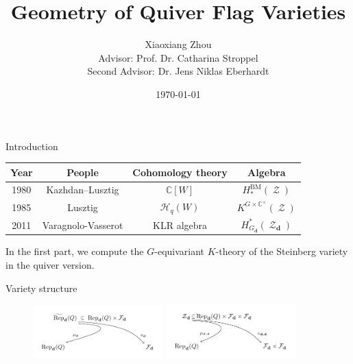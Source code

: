 \documentclass{beamer}
\numberwithin{equation}{section}
\theoremstyle{plain}
\numberwithin{equation}{section}
\theoremstyle{remark}
\DeclareMathOperator{\St}{\mathcal{Z}}
\DeclareMathOperator{\BM}{\operatorname{BM}}
\newcommand{\dimvec}[1]{\mathbf{#1}}
\def\arraystretch{1}
\begin{document}


\title{Geometry of Quiver Flag Varieties}
\author[Xiaoxiang Zhou]{Xiaoxiang Zhou\\[10mm]{\small Advisor: Prof. Dr. Catharina Stroppel \\ Second Advisor: Dr. Jens Niklas Eberhardt}}
\date{\today}

\begin{frame}
	\titlepage
\end{frame}

\begin{frame}[fragile]{Introduction}
\begingroup
\def\arraystretch{1.2}
\begin{table}[]
\begin{tabular}{c|c|c|c}
\hline
Year & People             & Cohomology theory  & Algebra                                    \\ \hline
1980 & Kazhdan--Lusztig   & $\mathbb{C}[W]$    & $H_*^{\BM}(\St)$                           \\ \hline
1985 & Lusztig            & $\mathcal{H}_q(W)$ & $K^{G \times \mathbb{C}^{\times}} (\St)$   \\ \hline
2011 & Varagnolo-Vasserot & KLR algebra        & $H_{G_{\dimvec{d}}}^{*}(\St_{\dimvec{d}})$ \\ \hline
\end{tabular}
\end{table}
\endgroup

In the first part, we compute the $G$-equivariant $K$-theory of the Steinberg variety in the quiver version.
\end{frame}

\begin{frame}[fragile]{Variety structure}
	\begin{figure}[ht]
	\centering
		\vspace{0cm}
			\parbox[t]{.48\textwidth}{\centering
			\vspace{0cm}
			\includegraphics[width=5cm]{comm_diagram/incidence_variety_2.pdf}
			}
			\parbox[t]{.48\textwidth}{\centering
			\vspace{0cm}
			\includegraphics[width=5cm]{comm_diagram/incidence_variety_4.pdf}
			}
			\vspace{-7mm}
	\end{figure}
\end{frame}
\end{document}
